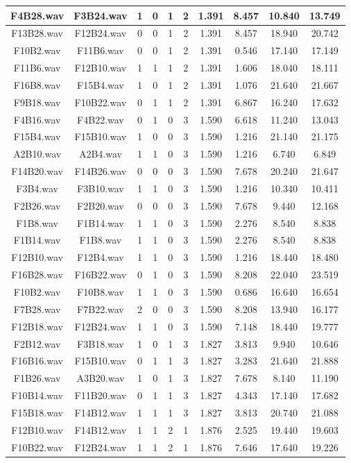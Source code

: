 \documentclass[11pt,a4paper]{book}
\begin{document}
\begin{longtable}[c]{|c|c|c|c|c|c|c|c|c|c|}
F4B28.wav&F3B24.wav&1&0&1&2&1.391&8.457&10.840&13.749\\ \hline
F13B28.wav&F12B24.wav&0&0&1&2&1.391&8.457&18.940&20.742\\ \hline
F10B2.wav&F11B6.wav&0&0&1&2&1.391&0.546&17.140&17.149\\ \hline
F11B6.wav&F12B10.wav&1&1&1&2&1.391&1.606&18.040&18.111\\ \hline
F16B8.wav&F15B4.wav&1&0&1&2&1.391&1.076&21.640&21.667\\ \hline
F9B18.wav&F10B22.wav&0&1&1&2&1.391&6.867&16.240&17.632\\ \hline
F4B16.wav&F4B22.wav&0&1&0&3&1.590&6.618&11.240&13.043\\ \hline
F15B4.wav&F15B10.wav&1&0&0&3&1.590&1.216&21.140&21.175\\ \hline
A2B10.wav&A2B4.wav&1&1&0&3&1.590&1.216&6.740&6.849\\ \hline
F14B20.wav&F14B26.wav&0&0&0&3&1.590&7.678&20.240&21.647\\ \hline
F3B4.wav&F3B10.wav&1&1&0&3&1.590&1.216&10.340&10.411\\ \hline
F2B26.wav&F2B20.wav&0&0&0&3&1.590&7.678&9.440&12.168\\ \hline
F1B8.wav&F1B14.wav&1&1&0&3&1.590&2.276&8.540&8.838\\ \hline
F1B14.wav&F1B8.wav&1&1&0&3&1.590&2.276&8.540&8.838\\ \hline
F12B10.wav&F12B4.wav&1&1&0&3&1.590&1.216&18.440&18.480\\ \hline
F16B28.wav&F16B22.wav&0&1&0&3&1.590&8.208&22.040&23.519\\ \hline
F10B2.wav&F10B8.wav&1&1&0&3&1.590&0.686&16.640&16.654\\ \hline
F7B28.wav&F7B22.wav&2&0&0&3&1.590&8.208&13.940&16.177\\ \hline
F12B18.wav&F12B24.wav&1&1&0&3&1.590&7.148&18.440&19.777\\ \hline
F2B12.wav&F3B18.wav&1&0&1&3&1.827&3.813&9.940&10.646\\ \hline
F16B16.wav&F15B10.wav&0&1&1&3&1.827&3.283&21.640&21.888\\ \hline
F1B26.wav&A3B20.wav&1&0&1&3&1.827&7.678&8.140&11.190\\ \hline
F10B14.wav&F11B20.wav&0&1&1&3&1.827&4.343&17.140&17.682\\ \hline
F15B18.wav&F14B12.wav&1&1&1&3&1.827&3.813&20.740&21.088\\ \hline
F12B10.wav&F14B12.wav&1&1&2&1&1.876&2.525&19.440&19.603\\ \hline
F10B22.wav&F12B24.wav&1&1&2&1&1.876&7.646&17.640&19.226\\ \hline

\end{longtable}
\end{document}
